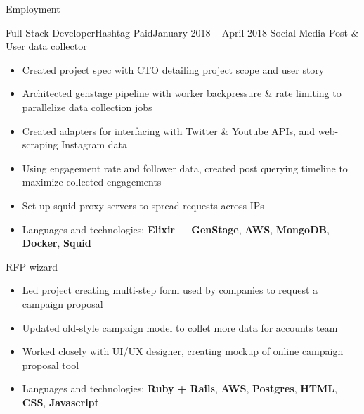 \documentclass[calibri]{mcdowellcv}
\begin{document}
    \begin{cvsection}{\Large{Employment}}
        \begin{cvsubsection}{Full Stack Developer}{Hashtag Paid}{January 2018 -- April 2018}
            Social Media Post \& User data collector
            \begin{itemize}
                \item Created project spec with CTO detailing project scope and user story
                \item Architected genstage pipeline with worker backpressure \& rate limiting to parallelize data collection jobs
                \item Created adapters for interfacing with Twitter \& Youtube APIs, and web-scraping Instagram data
                \item Using engagement rate and follower data, created post querying timeline to maximize collected engagements
                \item Set up squid proxy servers to spread requests across IPs
                \item Languages and technologies: \textbf{Elixir + GenStage}, \textbf{AWS}, \textbf{MongoDB}, \textbf{Docker}, \textbf{Squid}
            \end{itemize}

            RFP wizard
            \begin{itemize}
                \item Led project creating multi-step form used by companies to request a campaign proposal
                \item Updated old-style campaign model to collet more data for accounts team
                \item Worked closely with UI/UX designer, creating mockup of online campaign proposal tool
                \item Languages and technologies: \textbf{Ruby + Rails}, \textbf{AWS}, \textbf{Postgres}, \textbf{HTML}, \textbf{CSS}, \textbf{Javascript}
            \end{itemize}
        \end{cvsubsection}
    \end{cvsection}
\end{document}
